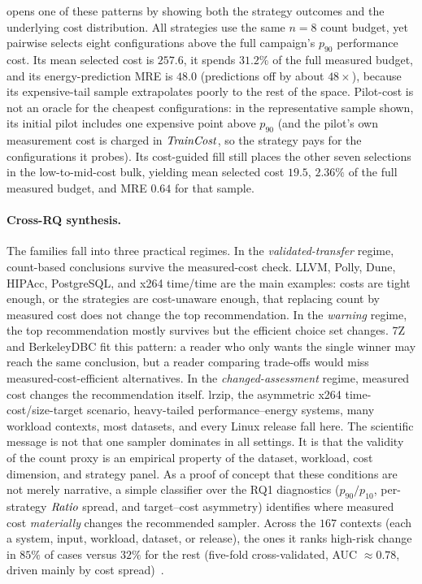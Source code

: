  opens one of these patterns by showing both the
strategy outcomes and the underlying cost distribution. All strategies use the
same $n=8$ count budget, yet pairwise selects eight configurations above the
full campaign's $p_{90}$ performance cost. Its mean selected cost is $257.6$,
it spends $31.2\%$ of the full measured budget, and its energy-prediction MRE is
$48.0$ (\ie predictions off by about $48\times$), because its expensive-tail
sample extrapolates poorly to the rest of the space. Pilot-cost is not an oracle for the cheapest configurations: in the
representative sample shown, its initial pilot includes one expensive point above
$p_{90}$ (and the pilot's own measurement cost is charged in $\mathit{TrainCost}$, so the
strategy pays for the configurations it probes). Its cost-guided fill still places
the other seven selections in the low-to-mid-cost bulk, yielding mean selected
cost $19.5$, $2.36\%$ of the full measured budget, and MRE $0.64$ for that sample.

\paragraph*{Cross-RQ synthesis.}
The families fall into three practical regimes. In the \emph{validated-transfer}
regime, count-based conclusions survive the measured-cost check. LLVM, Polly,
Dune, HIPAcc, PostgreSQL, and x264 time/time are the main examples: costs are
tight enough, or the strategies are cost-unaware enough, that replacing count by
measured cost does not change the top recommendation. In the \emph{warning}
regime, the top recommendation mostly survives but the efficient choice set
changes. 7Z and BerkeleyDBC fit this pattern: a reader who only wants the single
winner may reach the same conclusion, but a reader comparing trade-offs would
miss measured-cost-efficient alternatives. In the \emph{changed-assessment}
regime, measured cost changes the recommendation itself. lrzip, the asymmetric
x264 time-cost/size-target scenario, heavy-tailed performance--energy systems,
many workload contexts, most \StudyLCBench datasets, and every Linux release
fall here. The scientific message is not that one sampler dominates in all
settings. It is that the validity of the count proxy is an empirical property of
the dataset, workload, cost dimension, and strategy panel. As a proof of concept
that these conditions are not merely narrative, a simple classifier over the RQ1
diagnostics ($p_{90}/p_{10}$, per-strategy $\mathit{Ratio}$ spread, and target--cost
asymmetry) identifies where measured cost \emph{materially} changes the
recommended sampler. Across the $167$ contexts (each a system, input, workload,
dataset, or release), the ones it ranks high-risk change in $85\%$ of cases versus
$32\%$ for the rest (five-fold cross-validated, AUC $\approx0.78$, driven mainly by
cost spread)~\cite{artifact}.

